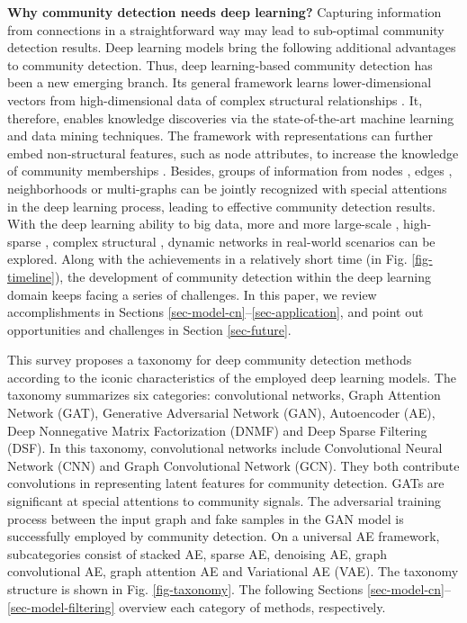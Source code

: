 \vspace{2mm}
\noindent
\textbf{Why community detection needs deep learning?} Capturing information from connections in a straightforward way may lead to sub-optimal community detection results. Deep learning models  bring the following additional advantages to community detection. Thus, deep learning-based community detection has been a new emerging branch. Its general framework learns lower-dimensional vectors from high-dimensional data of complex structural relationships . It, therefore, enables knowledge discoveries via the state-of-the-art machine learning and data mining techniques. The framework with representations can further embed non-structural features, such as node attributes, to increase the knowledge of community memberships . Besides, groups of information from nodes , edges , neighborhoods  or multi-graphs  can be jointly recognized with special attentions in the deep learning process, leading to effective community detection results. With the deep learning ability to big data, more and more large-scale , high-sparse , complex structural , dynamic  networks in real-world scenarios can be explored. Along with the achievements in a relatively short time (in Fig. \ref{fig-timeline}), the development of community detection within the deep learning domain keeps facing a series of challenges. In this paper, we review accomplishments in Sections \ref{sec-model-cn}--\ref{sec-application}, and point out opportunities and challenges in Section \ref{sec-future}.

\label{sec-categorization}
This survey proposes a taxonomy for deep community detection methods according to the iconic characteristics of the employed deep learning models. The taxonomy summarizes six categories: convolutional networks, Graph Attention Network (GAT), Generative Adversarial Network (GAN), Autoencoder (AE), Deep Nonnegative Matrix Factorization (DNMF) and Deep Sparse Filtering (DSF). In this taxonomy, convolutional networks include Convolutional Neural Network (CNN) and Graph Convolutional Network (GCN). They both contribute convolutions in representing latent features for community detection. GATs are significant at special attentions to community signals. The adversarial training process between the input graph and fake samples in the GAN model is successfully employed by community detection. On a universal AE framework, subcategories consist of stacked AE, sparse AE, denoising AE, graph convolutional AE, graph attention AE and Variational AE (VAE). The taxonomy structure is shown in Fig. \ref{fig-taxonomy}. The following Sections \ref{sec-model-cn}--\ref{sec-model-filtering} overview each category of methods, respectively.

